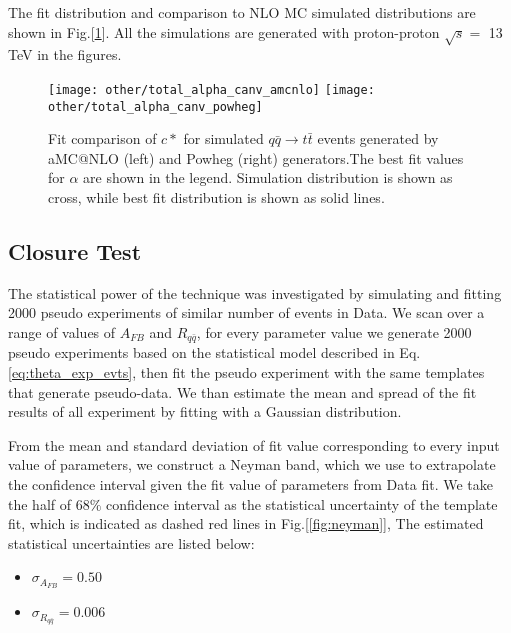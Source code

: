 \documentclass{cmspaperpdf}
\begin{document}
The fit distribution and comparison to NLO MC simulated distributions are shown in Fig.[\ref{fig:alpha_fit}]. All the simulations are generated with proton-proton $\sqrt{s}=$ 13 TeV in the figures. 

\begin{figure}[hbt]
  \begin{center}
    \texttt{[image: other/total\_alpha\_canv\_amcnlo]}
    \texttt{[image: other/total\_alpha\_canv\_powheg]}
  \caption{\small Fit comparison of $c*$ for simulated $q\bar q \rightarrow t \bar t$ events generated by aMC@NLO (left) and Powheg (right) generators.The best fit values for $\alpha$ are shown in the legend. Simulation distribution is shown as cross, while best fit distribution is shown as solid lines. }
    \label{fig:alpha_fit}
  \end{center}
\end{figure}


\subsection{Closure Test}

The statistical power of the technique was investigated by simulating and fitting 2000 pseudo experiments of similar number of events in Data. We scan over a range of values of $A_{FB}$ and $R_{q \bar q}$, for every parameter value we generate 2000 pseudo experiments based on the statistical model described in Eq.\ref{eq:theta_exp_evts}, then fit the pseudo experiment with the same templates that generate pseudo-data. We than estimate the mean and spread of the fit results of all experiment by fitting with a Gaussian distribution. 

From the mean and standard deviation of fit value corresponding to every input value of parameters, we construct a Neyman band, which we use to extrapolate the confidence interval given the fit value of parameters from Data fit. We take the half of $68\%$ confidence interval as the statistical uncertainty of the template fit, which is indicated as dashed red lines in Fig.[\ref{fig:neyman}], The estimated statistical uncertainties are listed below:

\begin{itemize}

\item $\sigma_{A_{FB}} = 0.50$
\item $\sigma_{R_{q\bar q}} = 0.006$
\end{itemize}
\end{document}
